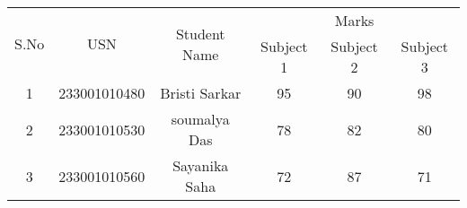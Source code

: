 \documentclass{article}
\begin{document}
\begin{table}[h!]
\centering
\begin{tabular}{|c|c|c|c|c|c|}
\hline
\multirow{2}{*}{S.No} & \multirow{2}{*}{USN} & \multirow{2}{*}{Student Name} & \multicolumn{3}{c|}{Marks} \\ \cline{4-6}
                      &                      &                               & Subject 1 & Subject 2 & Subject 3 \\ \hline
1                     & 233001010480               & Bristi Sarkar                     & 95        & 90        & 98        \\ \hline
2                     & 233001010530               & soumalya Das                & 78        & 82        & 80        \\ \hline
3                     & 233001010560             & Sayanika Saha            & 72        & 87        & 71        \\ \hline
\end{tabular}
\label{tab:student_marks}
\end{table}
\end{document}
